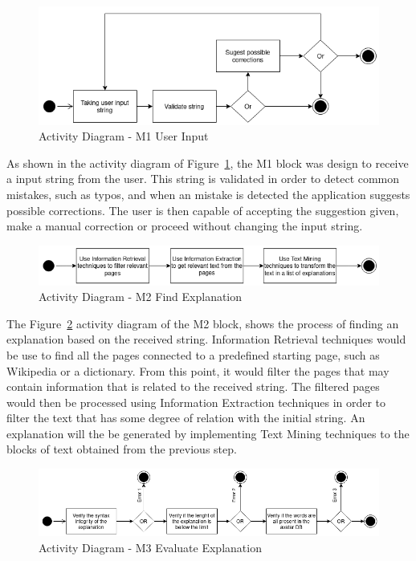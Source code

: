 \begin{figure}[H]
\centering
\includegraphics[width=\textwidth,keepaspectratio]{ch4/assets/M1.png}
\caption[Activity Diagram User Input Module]{Activity Diagram - M1 User Input}
\label{fig:M1}
\end{figure}

As shown in the activity diagram of Figure~\ref{fig:M1}, the M1 block was design to receive a input string from the user.
This string is validated in order to detect common mistakes, such as typos, and when an mistake is detected the application suggests possible corrections.
The user is then capable of accepting the suggestion given, make a manual correction or proceed without changing the input string.

\begin{figure}[H]
\centering
\includegraphics[width=\textwidth,keepaspectratio]{ch4/assets/M2.png}
\caption[Activity Diagram Find Explanation Module]{Activity Diagram - M2 Find Explanation}
\label{fig:M2}
\end{figure}

The Figure~\ref{fig:M2} activity diagram of the M2 block, shows the process of finding an explanation based on the received string.
Information Retrieval techniques would be use to find all the pages connected to a predefined starting page, such as Wikipedia or a dictionary.
From this point, it would filter the pages that may contain information that is related to the received string.
The filtered pages would then be processed using Information Extraction techniques in order to filter the text that has some degree of relation with the initial string.
An explanation will the be generated by implementing Text Mining techniques to the blocks of text obtained from the previous step.

\begin{figure}[H]
\centering
\includegraphics[width=\textwidth,keepaspectratio]{ch4/assets/M3.png}
\caption[Activity Diagram Evaluate Explanation Module]{Activity Diagram - M3 Evaluate Explanation}
\label{fig:M3}
\end{figure}

